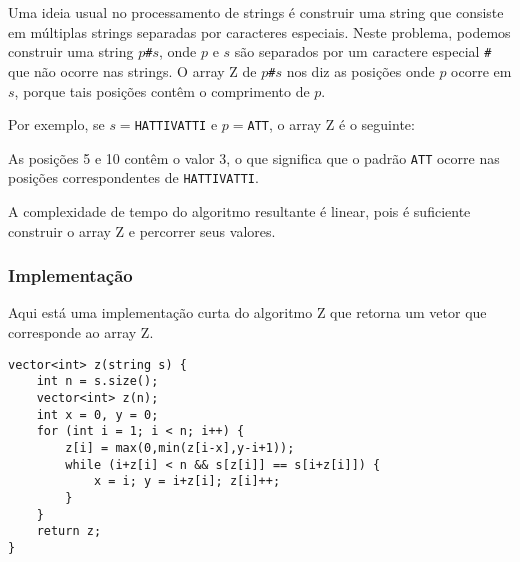Uma ideia usual no processamento de strings é construir uma string que consiste em múltiplas strings separadas por caracteres especiais. Neste problema, podemos construir uma string $p$\texttt{\#}$s$, onde $p$ e $s$ são separados por um caractere especial \texttt{\#} que não ocorre nas strings. O array Z de $p$\texttt{\#}$s$ nos diz as posições onde $p$ ocorre em $s$, porque tais posições contêm o comprimento de $p$.

Por exemplo, se $s=$\texttt{HATTIVATTI} e $p=$\texttt{ATT}, o array Z é o seguinte:

\begin{center}
\end{center}

As posições 5 e 10 contêm o valor 3, o que significa que o padrão \texttt{ATT} ocorre nas posições correspondentes de \texttt{HATTIVATTI}.

A complexidade de tempo do algoritmo resultante é linear, pois é suficiente construir o array Z e percorrer seus valores.

\subsubsection{Implementação}

Aqui está uma implementação curta do algoritmo Z que retorna um vetor que corresponde ao array Z.

\begin{lstlisting}
vector<int> z(string s) {
    int n = s.size();
    vector<int> z(n);
    int x = 0, y = 0;
    for (int i = 1; i < n; i++) {
        z[i] = max(0,min(z[i-x],y-i+1));
        while (i+z[i] < n && s[z[i]] == s[i+z[i]]) {
            x = i; y = i+z[i]; z[i]++;
        }
    }
    return z;
}
\end{lstlisting}
